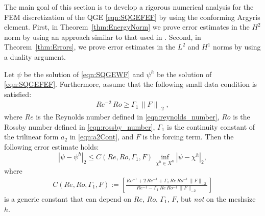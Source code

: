 The main goal of this section is to develop a rigorous numerical analysis for the FEM discretization
of the QGE \eqref{eqn:SQGEFEF} by using the conforming Argyris element.  First, in
Theorem~\ref{thm:EnergyNorm} we prove error estimates in the $H^2$ norm by using an approach similar
to that used in \cite{Cayco86}.  Second, in Theorem~\ref{thm:Errors}, we prove error estimates in
the $L^2$ and $H^1$ norms by using a duality argument.

\begin{thm}
\label{thm:EnergyNorm}
  Let $\psi$ be the solution of \eqref{eqn:SQGEWF} and $\psi^h$ be the solution
  of \eqref{eqn:SQGEFEF}.
  Furthermore, assume that the following small data condition is satisfied:
  \begin{eqnarray}
  Re^{-2} \, Ro
  \geq \Gamma_1 \, \| F \|_{-2} ,
  \label{eqn:small_data_condition}
  \end{eqnarray}
where
$Re$ is the Reynolds number defined in \eqref{eqn:reynolds_number},
$Ro$  is the Rossby number defined in \eqref{eqn:rossby_number},
 $\Gamma_1$ is the continuity constant of the trilinear form $a_2$ in \eqref{eqn:a2Cont}, and
 $F$ is the forcing term.
Then the following error estimate holds:
  \begin{equation}
    |\psi - \psi^h|_2
    \le C(Re, Ro, \Gamma_1, F) \, \inf_{\chi^h \in X^h} |\psi - \chi^h|_2 ,
    \label{eqn:EnergyNorm}
  \end{equation}
  where
  \begin{eqnarray}
  C(Re, Ro, \Gamma_1, F)
  := \left[
  \frac{
  Ro^{-1}
  + 2 \, Re^{-1}
  + \Gamma_1 \, Re \, Ro^{-1} \, \| F \|_{-2}
  }
  {
  Re^{-1}
  - \Gamma_1 \, Re \, Ro^{-1} \, \| F \|_{-2}
  }
  \right]
  \label{eqn:constant_definition}
  \end{eqnarray}
is a generic constant that can depend on $Re$, $Ro$, $\Gamma_1$, $F$, but \emph{not} on the meshsize $h$.
\end{thm}


